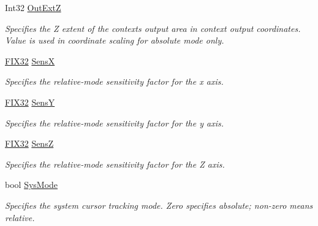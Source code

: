 \begin{DoxyCompactItemize}
Int32 \mbox{\hyperlink{class_wintab_d_n_1_1_c_wintab_context_a02c9755f5d0ccefef8aa8728136b3c7d}{Out\+ExtZ}}
\begin{DoxyCompactList}\small\item\em Specifies the Z extent of the context\textquotesingle{}s output area in context output coordinates. Value is used in coordinate scaling for absolute mode only. \end{DoxyCompactList}\item 
\mbox{\hyperlink{class_wintab_d_n_1_1_f_i_x32}{F\+I\+X32}} \mbox{\hyperlink{class_wintab_d_n_1_1_c_wintab_context_ab5cff8c2a8dbecad852fb2fb7d4a31d4}{SensX}}
\begin{DoxyCompactList}\small\item\em Specifies the relative-\/mode sensitivity factor for the x axis. \end{DoxyCompactList}\item 
\mbox{\hyperlink{class_wintab_d_n_1_1_f_i_x32}{F\+I\+X32}} \mbox{\hyperlink{class_wintab_d_n_1_1_c_wintab_context_ac35412cff3ea7455fedd6e2e38cd65e5}{SensY}}
\begin{DoxyCompactList}\small\item\em Specifies the relative-\/mode sensitivity factor for the y axis. \end{DoxyCompactList}\item 
\mbox{\hyperlink{class_wintab_d_n_1_1_f_i_x32}{F\+I\+X32}} \mbox{\hyperlink{class_wintab_d_n_1_1_c_wintab_context_a4908c82cd430554df3ca0e1268ee3af9}{SensZ}}
\begin{DoxyCompactList}\small\item\em Specifies the relative-\/mode sensitivity factor for the Z axis. \end{DoxyCompactList}\item 
bool \mbox{\hyperlink{class_wintab_d_n_1_1_c_wintab_context_a50763a15570f18f433580630dfa7fe8a}{Sys\+Mode}}
\begin{DoxyCompactList}\small\item\em Specifies the system cursor tracking mode. Zero specifies absolute; non-\/zero means relative. \end{DoxyCompactList}\item 

\end{DoxyCompactItemize}
